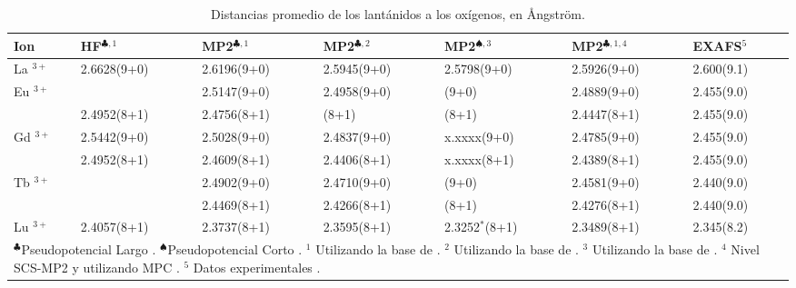 \begin{table}[h!]
\centering  %
\caption{\footnotesize Distancias promedio de los lant\'anidos a los 
ox\'igenos, en {\AA}ngstr\"om.}
\begin{tabular}{p{1cm}|p{1.8cm}p{1.8cm}p{1.8cm}p{1.8cm}p{1.8cm}p{1.8cm}}\hline\hline
Ion & HF$^{\clubsuit,1}$ & MP2$^{\clubsuit,1}$ & MP2$^{\clubsuit,2}$ & MP2$^{\spadesuit,3}$ & MP2$^{\clubsuit,1,4}$ & EXAFS$^5$ \\ \hline
La $^{3+}$ & 2.6628(9+0) & 2.6196(9+0) & 2.5945(9+0) & 2.5798(9+0) 
& 2.5926(9+0) & 2.600(9.1) \\ 
Eu $^{3+}$ &             & 2.5147(9+0) & 2.4958(9+0) &       (9+0)  
& 2.4889(9+0) & 2.455(9.0) \\ 
           & 2.4952(8+1) & 2.4756(8+1) &       (8+1) &       (8+1) 
& 2.4447(8+1) & 2.455(9.0)  \\ 
Gd $^{3+}$ & 2.5442(9+0) & 2.5028(9+0) & 2.4837(9+0) & x.xxxx(9+0)  
& 2.4785(9+0) & 2.455(9.0) \\ 
           & 2.4952(8+1) & 2.4609(8+1) & 2.4406(8+1) & x.xxxx(8+1) 
& 2.4389(8+1) & 2.455(9.0)  \\ 
Tb $^{3+}$ &             & 2.4902(9+0) & 2.4710(9+0) &       (9+0)
& 2.4581(9+0) & 2.440(9.0)  \\
           &             & 2.4469(8+1) & 2.4266(8+1) &       (8+1)
& 2.4276(8+1) & 2.440(9.0)  \\
Lu $^{3+}$ & 2.4057(8+1) & 2.3737(8+1) & 2.3595(8+1) & 2.3252$^*$(8+1) 
& 2.3489(8+1) & 2.345(8.2) \\ 
\hline 
\multicolumn{7}{p{14cm}}{\footnotesize{
$^{\clubsuit }$Pseudopotencial Largo \citep{Dolg1989}.}%
$^{\spadesuit}$Pseudopotencial Corto \citep{Cao2001}. %
{\footnotesize $^1$ Utilizando la base de \cite{Dolg1993}.}%
{\footnotesize $^2$ Utilizando la base de \cite{Yang2005}.}%
{\footnotesize $^3$ Utilizando la base de \cite{Cao2002}.} %
{\footnotesize $^4$ Nivel SCS-MP2 \citep{Grim2003} y utilizando MPC 
\citep{Toma2005}. $^5$ Datos experimentales \citep{Dang2012}.}}%
\end{tabular}\label{tDis}\end{table}
